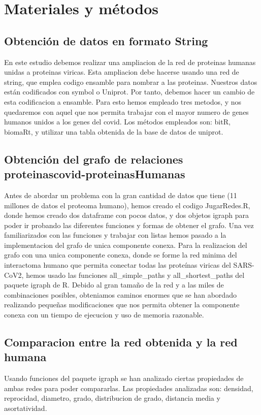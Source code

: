 \section{Materiales y métodos}


\subsection{Obtención de datos en formato String}
En este estudio debemos realizar una ampliacion de la red de proteinas humanas unidas a proteinas viricas.
Esta ampliacion debe hacerse usando una red de string, que emplea codigo ensamble para nombrar a las proteinas.
Nuestros datos están codificados con symbol o Uniprot. Por tanto, debemos hacer un cambio de esta codificacion a ensamble.
Para esto hemos empleado tres metodos, y nos quedaremos con aquel que nos permita trabajar con el mayor numero de genes humanos unidos a los genes del covid.
Los métodos empleados son: bitR, biomaRt, y utilizar una tabla obtenida de la base de datos de uniprot. 

\subsection{Obtención del grafo de relaciones proteinascovid-proteinasHumanas}
Antes de abordar un problema con la gran cantidad de datos que tiene (11 millones de datos el proteoma humano), hemos creado el codigo JugarRedes.R, donde hemos creado dos dataframe con pocos datos, y dos objetos igraph para poder ir probando las diferentes funciones y formas de obtener el grafo. Una vez familiarizados con las funciones y trabajar con listas hemos pasado a la implementacion del grafo de unica componente conexa.
Para la realizacion del grafo con una unica componente conexa, donde se forme la red minima del interactoma humano
que permita conectar todas las proteínas viricas del SARS-CoV2, hemos usado las funciones all\_simple\_paths y all\_shortest\_paths 
del paquete igraph de R. Debido al gran tamaño de la red y a las miles de combinaciones posibles, obteniamos caminos enormes que
se han abordado realizando pequeñas modificaciones que nos permita obtener la componente conexa con un tiempo de ejecucion y 
uso de memoria razonable. 

\subsection{Comparacion entre la red obtenida y la red humana}
Usando funciones del paquete igraph se han analizado ciertas propiedades de ambas redes para poder compararlas. 
Las propiedades analizadas son: densidad, reprocidad, diametro, grado, distribucion de grado, distancia media y asortatividad.

